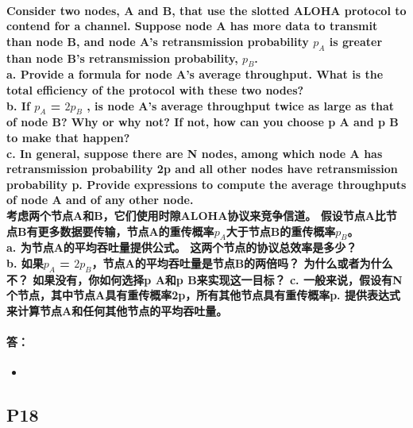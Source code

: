 \documentclass[a4paper]{ctexart}
\begin{document}
\paragraph*{Consider two nodes, A and B, that use the slotted ALOHA protocol to contend for a channel. Suppose node A has more data to transmit than node B, and node A’s retransmission probability $p_A$ is greater than node B’s retransmission probability, $p_B$.\\
a. Provide a formula for node A’s average throughput. What is the total efficiency of the protocol with these two nodes?\\
b. If $p_A$ = $2p_B$ , is node A’s average throughput twice as large as that of node B? Why or why not? If not, how can you choose p A and p B to make that happen?\\
c. In general, suppose there are N nodes, among which node A has retransmission probability 2p and all other nodes have retransmission probability p. Provide expressions to compute the average throughputs of node A and of any other node.\\
考虑两个节点A和B，它们使用时隙ALOHA协议来竞争信道。 假设节点A比节点B有更多数据要传输，节点A的重传概率$ p_A $大于节点B的重传概率$ p_B $。\\
a. 为节点A的平均吞吐量提供公式。 这两个节点的协议总效率是多少？\\
b. 如果$ p_A $ = $ 2p_B $，节点A的平均吞吐量是节点B的两倍吗？ 为什么或者为什么不？ 如果没有，你如何选择p A和p B来实现这一目标？
c. 一般来说，假设有N个节点，其中节点A具有重传概率2p，所有其他节点具有重传概率p. 提供表达式来计算节点A和任何其他节点的平均吞吐量。}
\paragraph*{答：} 
\begin{itemize}
    \item 
\end{itemize}


\subsection*{P18}
\end{document}

